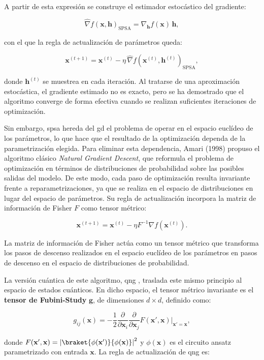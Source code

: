 A partir de esta expresión se construye el estimador estocástico del gradiente:

\[
  \widehat{\nabla} f(\mathbf{x}, \mathbf{h})_{\text{SPSA}} = \nabla_{\mathbf{h}} f(\mathbf{x})\, \mathbf{h},
\]

con el que la regla de actualización de parámetros queda:

\[
  \mathbf{x}^{(t+1)} = \mathbf{x}^{(t)} - \eta\, \widehat{\nabla} f(\mathbf{x}^{(t)}, \mathbf{h}^{(t)})_{\text{SPSA}},
\]

donde $\mathbf{h}^{(t)}$ se muestrea en cada iteración. Al tratarse de una aproximación estocástica, el gradiente estimado no es exacto, pero se ha demostrado que el algoritmo converge de forma efectiva cuando se realizan suficientes iteraciones de optimización.

Sin embargo, \gls{spsa} hereda del \gls{gd} el problema de operar en el espacio euclídeo de los parámetros, lo que hace que el resultado de la optimización dependa de la parametrización elegida. Para eliminar esta dependencia, Amari (1998) propuso el algoritmo clásico \textit{Natural Gradient Descent}, que reformula el problema de optimización en términos de distribuciones de probabilidad sobre las posibles salidas del modelo. De este modo, cada paso de optimización resulta invariante frente a reparametrizaciones, ya que se realiza en el espacio de distribuciones en lugar del espacio de parámetros. Su regla de actualización incorpora la matriz de información de Fisher $F$ como tensor métrico:

\[
  \mathbf{x}^{(t+1)} = \mathbf{x}^{(t)} - \eta F^{-1} \nabla f(\mathbf{x}^{(t)}).
\]

La matriz de información de Fisher actúa como un tensor métrico que transforma los pasos de descenso realizados en el espacio euclídeo de los parámetros en pasos de descenso en el espacio de distribuciones de probabilidad.

La versión cuántica de este algoritmo, \gls{qng} \cite{stokes_qng_2020}, traslada este mismo principio al espacio de estados cuánticos. En dicho espacio, el tensor métrico invariante es el \textbf{tensor de Fubini-Study} $\mathbf{g}$, de dimensiones $d \times d$, definido como:

\[
  g_{ij}(\mathbf{x}) = -\frac{1}{2} \frac{\partial}{\partial \mathbf{x}_i} \frac{\partial}{\partial \mathbf{x}_j} F(\mathbf{x}', \mathbf{x}) \bigg|_{\mathbf{x}'=\mathbf{x}},
\]

donde $F(\mathbf{x}', \mathbf{x}) = \left| \braket{\phi(\mathbf{x}')}{\phi(\mathbf{x})} \right|^2$ y $\phi(\mathbf{x})$ es el circuito ansatz parametrizado con entrada $\mathbf{x}$. La regla de actualización de \gls{qng} es:

